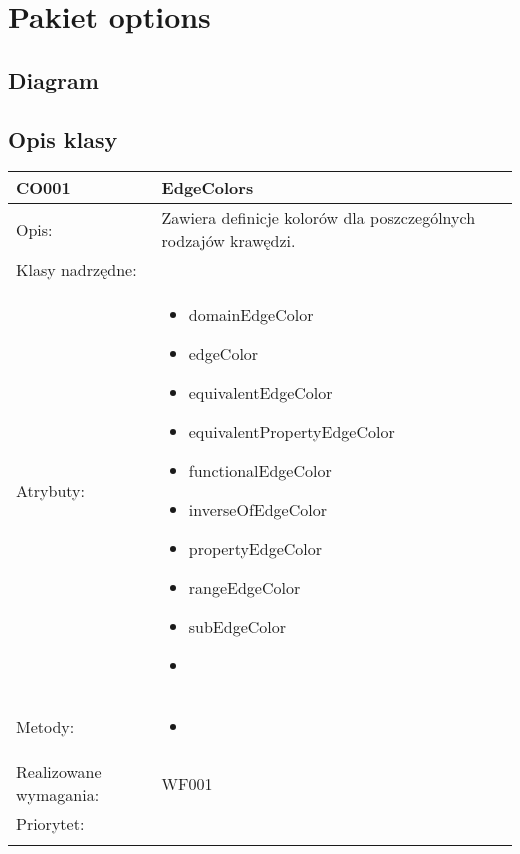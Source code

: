 \documentclass[a4paper,10pt]{article}
\begin{document}
\section{Pakiet options}

\subsection{Diagram}

\subsection{Opis klasy}

\begin{center}
 


\begin{longtable}{|m{3cm}|m{9cm}|} \hline

CO001 & EdgeColors \\ \hline
Opis: & Zawiera definicje kolorów dla poszczególnych rodzajów krawędzi.   \\ \hline
Klasy nadrzędne: &     \\ \hline
Atrybuty: & \begin{itemize}
 \item domainEdgeColor
 \item edgeColor
 \item equivalentEdgeColor
 \item equivalentPropertyEdgeColor
 \item functionalEdgeColor
 \item inverseOfEdgeColor
 \item propertyEdgeColor
 \item rangeEdgeColor
 \item subEdgeColor
 \item 
\end{itemize}
 \\ \hline
Metody: & \begin{itemize}
 \item 
\end{itemize}
  \\ \hline
Realizowane wymagania: & WF001 \\ \hline
Priorytet: &  \\ \hline

\multicolumn{2}{c}{} \\
 \hline


\end{longtable}
\end{center}
\end{document}
